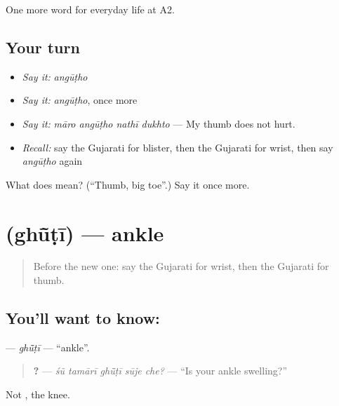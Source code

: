 \begin{grammarlens}[title={What you've built}]
One more word for everyday life at A2.
\end{grammarlens}

\subsection*{Your turn}
\begin{itemize}
\raggedright
  \item \emph{Say it:} \emph{angūṭho}
  \item \emph{Say it:} \emph{angūṭho}, once more
  \item \emph{Say it:} \emph{māro angūṭho nathī dukhto} — My thumb does not hurt.
  \item \emph{Recall:} say the Gujarati for blister, then the Gujarati for wrist, then say \emph{angūṭho} again
\end{itemize}

\begin{tcolorbox}[breakable,colback=teal!4,colframe=teal!35!black,title={Before you move on}]
What does  mean? (\textquotedblleft{}Thumb, big toe\textquotedblright{}.) Say it once more.
\end{tcolorbox}
\section[\texorpdfstring{\gu{ઘૂંટી} (ghū̃ṭī)}{ઘૂંટી (ghū̃ṭī)}]{ (ghū̃ṭī) — ankle}

\label{lesson:GU-C229-ghuti}



\begin{quote}
Before the new one: say the Gujarati for wrist, then the Gujarati for thumb.
\end{quote}

\subsection*{You'll want to know: }
\textbf{} — \emph{ghū̃ṭī} — \textquotedblleft{}ankle\textquotedblright{}.

\begin{quote}
\textbf{    ?} — \emph{śũ tamārī ghū̃ṭī sūje che?} — \textquotedblleft{}Is your ankle swelling?\textquotedblright{}
\end{quote}

Not \textbf{}, the knee.

